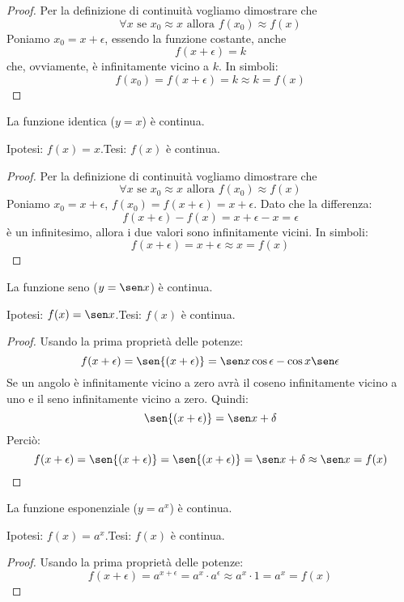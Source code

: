 \begin{proof}
Per la definizione di continuità vogliamo dimostrare che 
\[\forall x \text{ se } x_0 \approx x \text{ allora } f(x_0) \approx f(x)\]
Poniamo \(x_0=x+\epsilon\), essendo la funzione costante, anche 
\[f(x+\epsilon)=k\] 
che, ovviamente, è infinitamente vicino a \(k\). In simboli:
\[f(x_0) = f(x+\epsilon) = k \approx k = f(x)\] 
\end{proof}

\begin{teorema}
La funzione identica (\(y=x\)) è continua.
\end{teorema}

\noindent Ipotesi: \(f(x)=x\).\tab Tesi: \(f(x)\) è continua.

\begin{proof}
Per la definizione di continuità vogliamo dimostrare che 
\[\forall x \text{ se } x_0 \approx x \text{ allora } f(x_0) \approx f(x)\]
Poniamo \(x_0=x+\epsilon\), \(f(x_0) = f(x+\epsilon)=x+\epsilon\). 
Dato che la differenza:
\[f(x+\epsilon)-f(x) = x+\epsilon-x= \epsilon\]
è un infinitesimo, allora i due valori sono infinitamente vicini. In simboli:
\[f(x+\epsilon) = x+\epsilon \approx x = f(x)\] 
\end{proof}

\begin{teorema}
La funzione seno (\(y=\sen x\)) è continua.
\end{teorema}

\noindent Ipotesi: \(f(x)=\sen x\).\tab Tesi: \(f(x)\) è continua.

\begin{proof}
Usando la prima proprietà delle potenze:
\[f(x+\epsilon) =
\sen{(x+\epsilon)} = \sen x \cos \epsilon - \cos x \sen \epsilon\]
Se un angolo è infinitamente vicino a zero avrà il coseno infinitamente vicino 
a uno e il seno infinitamente vicino a zero. Quindi:
\[\sen{(x+\epsilon)} = \sen x + \delta\]
Perciò:
\[f(x+\epsilon) =
\sen{(x+\epsilon)} = \sen{(x+\epsilon)} = 
\sen x + \delta \approx \sen x = f(x)\]
\end{proof}

\begin{teorema}
La funzione esponenziale (\(y=a^x\)) è continua.
\end{teorema}

\noindent Ipotesi: \(f(x)=a^x\).\tab Tesi: \(f(x)\) è continua.

\begin{proof}
Usando la prima proprietà delle potenze:
\[f(x+\epsilon) =
a^{x+\epsilon} = a^{x} \cdot a^{\epsilon} \approx a^{x} \cdot 1 = a^{x} = f(x)\]
\end{proof}


